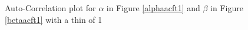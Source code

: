 \documentclass[12pt, leqno]{article}
\begin{document}
\begin{figure}
\centering
{}
\centering
\qquad
\centering
{}
\caption{Auto-Correlation plot for $\alpha$ in Figure \ref{alphaacft1}
  and $\beta$ in Figure \ref{betaacft1} with a thin of 1}
\end{figure}
\end{document}
